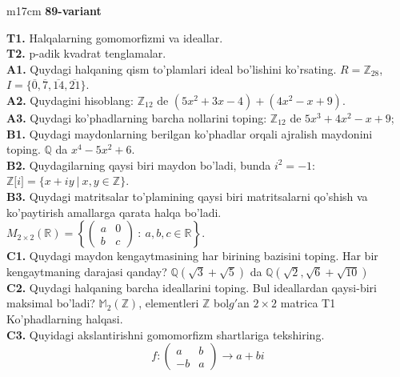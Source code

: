\documentclass{article}
\begin{document}
\begin{tabular}{m{17cm}}
\textbf{89-variant}
\newline

\textbf{T1.} Halqalarning gomomorfizmi va ideallar. \\
\textbf{T2.} p-adik kvadrat tenglamalar. \\
\textbf{A1.} Quydagi halqaning qism to'plamlari ideal bo'lishini ko'rsating.
\(R = \mathbb{Z}_{28}\), \(I = \{\overline{0},\overline{7},\overline{14},\overline{21}\}\). \\
\textbf{A2.} Quydagini hisoblang:
\(\mathbb{Z}_{12}\) de \(\left( 5x^{2} + 3x - 4 \right) + \left( 4x^{2} - x + 9 \right)\). \\
\textbf{A3.} Quydagi ko'phadlarning barcha nollarini toping:
\(\mathbb{Z}_{12}\) de \(5x^{3} + 4x^{2} - x + 9\); \\
\textbf{B1.} Quydagi maydonlarning berilgan ko'phadlar orqali ajralish maydonini toping.
\(\mathbb{Q}\) da \(x^{4} - 5x^{2} + 6\). \\
\textbf{B2.} Quydagilarning qaysi biri maydon bo'ladi, bunda \(i^{2} = - 1\):
\(\mathbb{Z\lbrack}i\rbrack = \{ x + iy\ |\ x,y \in \mathbb{Z\}}\). \\
\textbf{B3.} Quydagi matritsalar to'plamining qaysi biri matritsalarni qo'shish va ko'paytirish amallarga qarata halqa bo'ladi.
\(M_{2 \times 2}\mathbb{(R) =}\left\{ \begin{pmatrix}
a & 0 \\
b & c
\end{pmatrix}\ :\ a,b,c \in \mathbb{R} \right\}\). \\
\textbf{C1.} Quydagi maydon kengaytmasining har birining bazisini toping. Har bir kengaytmaning darajasi qanday?
\(\mathbb{Q}\left( \sqrt{3} + \sqrt{5} \right)\) da \(\mathbb{Q}\left( \sqrt{2},\sqrt{6} + \sqrt{10} \right)\) \\
\textbf{C2.} Quydagi halqaning barcha ideallarini toping. Bul ideallardan qaysi-biri maksimal bo'ladi?
\(\mathbb{M}_{2}\left( \mathbb{Z} \right)\), elementleri \(\mathbb{Z}\) bol\(g'\)an \(2 \times 2\) matrica
T1 Ko'phadlarning halqasi. \\
\textbf{C3.} Quyidagi akslantirishni gomomorfizm shartlariga tekshiring.
\[f:\begin{pmatrix}
a & b \\
 - b & a
\end{pmatrix} \rightarrow a + bi\] \\

\end{tabular}
\vspace{1cm}
\end{document}
